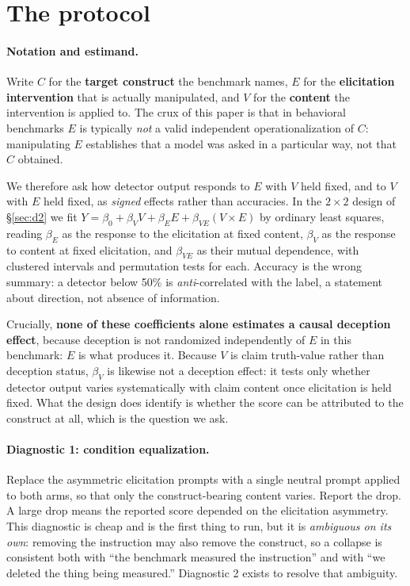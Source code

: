 \section{The protocol}
\label{sec:protocol}

\paragraph{Notation and estimand.} Write $C$ for the \textbf{target construct} the benchmark names, $E$ for the \textbf{elicitation intervention} that is actually manipulated, and $V$ for the \textbf{content} the intervention is applied to. The crux of this paper is that in behavioral benchmarks $E$ is typically \emph{not} a valid independent operationalization of $C$: manipulating $E$ establishes that a model was asked in a particular way, not that $C$ obtained.

We therefore ask how detector output responds to $E$ with $V$ held fixed, and to $V$ with $E$ held fixed, as \emph{signed} effects rather than accuracies. In the $2\!\times\!2$ design of §\ref{sec:d2} we fit $Y=\beta_0+\beta_V V+\beta_E E+\beta_{VE}(V\!\times\!E)$ by ordinary least squares, reading $\beta_E$ as the response to the elicitation at fixed content, $\beta_V$ as the response to content at fixed elicitation, and $\beta_{VE}$ as their mutual dependence, with clustered intervals and permutation tests for each. Accuracy is the wrong summary: a detector below 50\% is \emph{anti}-correlated with the label, a statement about direction, not absence of information.

Crucially, \textbf{none of these coefficients alone estimates a causal deception effect}, because deception is not randomized independently of $E$ in this benchmark: $E$ is what produces it. Because $V$ is claim truth-value rather than deception status, $\beta_V$ is likewise not a deception effect: it tests only whether detector output varies systematically with claim content once elicitation is held fixed. What the design does identify is whether the score can be attributed to the construct at all, which is the question we ask.

\paragraph{Diagnostic 1: condition equalization.} Replace the asymmetric elicitation prompts with a single neutral prompt applied to both arms, so that only the construct-bearing content varies. Report the drop. A large drop means the reported score depended on the elicitation asymmetry. This diagnostic is cheap and is the first thing to run, but it is \emph{ambiguous on its own}: removing the instruction may also remove the construct, so a collapse is consistent both with ``the benchmark measured the instruction'' and with ``we deleted the thing being measured.'' Diagnostic 2 exists to resolve that ambiguity.

